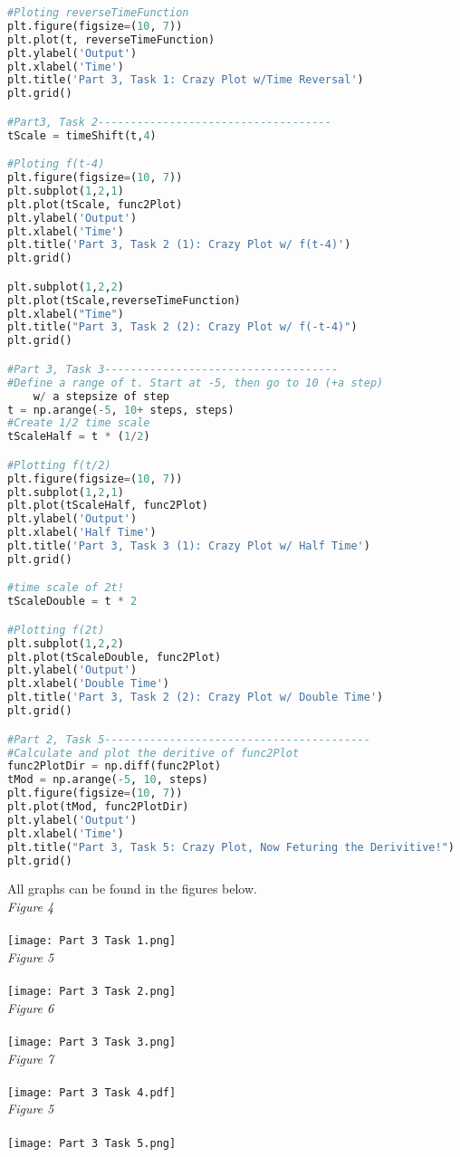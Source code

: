 \documentclass[12pt,a4paper]{article}
\begin{document}
\begin{lstlisting}[language=Python]
#Ploting reverseTimeFunction
plt.figure(figsize=(10, 7))
plt.plot(t, reverseTimeFunction)
plt.ylabel('Output')
plt.xlabel('Time')
plt.title('Part 3, Task 1: Crazy Plot w/Time Reversal')
plt.grid()

#Part3, Task 2------------------------------------
tScale = timeShift(t,4)

#Ploting f(t-4)
plt.figure(figsize=(10, 7))
plt.subplot(1,2,1)
plt.plot(tScale, func2Plot)
plt.ylabel('Output')
plt.xlabel('Time')
plt.title('Part 3, Task 2 (1): Crazy Plot w/ f(t-4)')
plt.grid()

plt.subplot(1,2,2)
plt.plot(tScale,reverseTimeFunction)
plt.xlabel("Time")
plt.title("Part 3, Task 2 (2): Crazy Plot w/ f(-t-4)")
plt.grid()

#Part 3, Task 3------------------------------------
#Define a range of t. Start at -5, then go to 10 (+a step) 
    w/ a stepsize of step
t = np.arange(-5, 10+ steps, steps)
#Create 1/2 time scale
tScaleHalf = t * (1/2)

#Plotting f(t/2)
plt.figure(figsize=(10, 7))
plt.subplot(1,2,1)
plt.plot(tScaleHalf, func2Plot)
plt.ylabel('Output')
plt.xlabel('Half Time')
plt.title('Part 3, Task 3 (1): Crazy Plot w/ Half Time')
plt.grid()

#time scale of 2t!
tScaleDouble = t * 2

#Plotting f(2t)
plt.subplot(1,2,2)
plt.plot(tScaleDouble, func2Plot)
plt.ylabel('Output')
plt.xlabel('Double Time')
plt.title('Part 3, Task 2 (2): Crazy Plot w/ Double Time')
plt.grid()

#Part 2, Task 5-----------------------------------------
#Calculate and plot the deritive of func2Plot
func2PlotDir = np.diff(func2Plot)
tMod = np.arange(-5, 10, steps)
plt.figure(figsize=(10, 7))
plt.plot(tMod, func2PlotDir)
plt.ylabel('Output')
plt.xlabel('Time')
plt.title("Part 3, Task 5: Crazy Plot, Now Feturing the Derivitive!")
plt.grid()

\end{lstlisting}
All graphs can be found in the figures below.\\
\textit{Figure 4}\\
\\\texttt{[image: Part 3 Task 1.png]}\\
\textit{Figure 5}\\
\\\texttt{[image: Part 3 Task 2.png]}\\
\textit{Figure 6}\\
\\\texttt{[image: Part 3 Task 3.png]}\\
\textit{Figure 7}\\
\\\texttt{[image: Part 3 Task 4.pdf]}\\
\textit{Figure 5}\\
\\\texttt{[image: Part 3 Task 5.png]}\\
\end{document}

